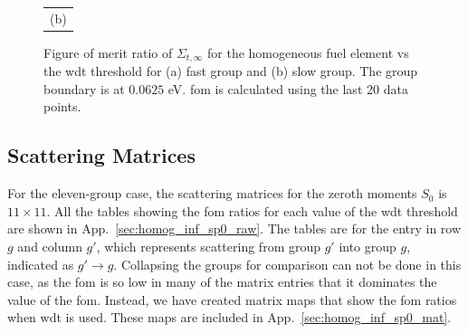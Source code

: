 \begin{figure}[hbtp]
\begin{tabular}{c}
    (b) 
  \end{tabular}
  \caption[Figure of merit ratio of the $\Sigma_{t,\infty}$ for the
  homogeneous fuel element]{Figure of merit ratio of
    $\Sigma_{t,\infty}$ for the homogeneous fuel element vs the \gls{wdt}
    threshold for (a) fast group and (b) slow group. The group
    boundary is at $0.0625$ eV. \gls{fom} is calculated using the last
    20 data points.}
  \label{fig:homog_inf_tot}
\end{figure}

\subsection{Scattering Matrices}
\label{sec:homog_inf_sp0}

For the eleven-group case, the scattering matrices for the zeroth
moments $S_0$ is $11 \times 11$. All the tables showing the \gls{fom}
ratios for each value of the \gls{wdt} threshold are shown in
App.~\ref{sec:homog_inf_sp0_raw}. The tables are for the entry in row $g$
and column $g'$, which represents scattering from group $g'$ into
group $g$, indicated as $g' \to g$. Collapsing the groups for
comparison can not be done in this case, as the \gls{fom} is so low in
many of the matrix entries that it dominates the value of the
\gls{fom}. Instead, we have created matrix maps that show the
\gls{fom} ratios when \gls{wdt} is used. These maps are included in
App.~\ref{sec:homog_inf_sp0_mat}. 

